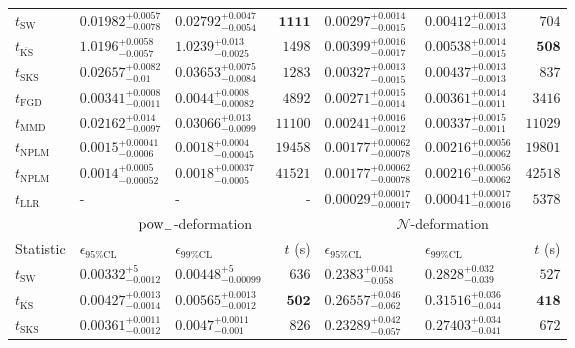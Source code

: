 \begin{tabular}{l|llr|llr}
	\midrule
	$t_{\mathrm{SW}}$ & $0.01982_{-0.0078}^{+0.0057}$ & $0.02792_{-0.0054}^{+0.0047}$ & ${\mathbf{1111}}$ & $0.00297_{-0.0015}^{+0.0014}$ & $0.00412_{-0.0013}^{+0.0013}$ & $704$ \\
	$t_{\overline{\mathrm{KS}}}$ & $1.0196_{-0.0057}^{+0.0058}$ & $1.0239_{-0.0025}^{+0.013}$ & $1498$ & $0.00399_{-0.0017}^{+0.0016}$ & $0.00538_{-0.0015}^{+0.0014}$ & ${\mathbf{508}}$ \\
	$t_{\mathrm{SKS}}$ & $0.02657_{-0.01}^{+0.0082}$ & $0.03653_{-0.0084}^{+0.0075}$ & $1283$ & $0.00327_{-0.0015}^{+0.0013}$ & $0.00437_{-0.0013}^{+0.0013}$ & $837$ \\
	$t_{\mathrm{FGD}}$ & ${\mathbf{0.00341_{-0.0011}^{+0.0008}}}$ & ${\mathbf{0.0044_{-0.00082}^{+0.0008}}}$ & $4892$ & $0.00271_{-0.0014}^{+0.0015}$ & $0.00361_{-0.0011}^{+0.0014}$ & $3416$ \\
	$t_{\mathrm{MMD}}$ & $0.02162_{-0.0097}^{+0.014}$ & $0.03066_{-0.0099}^{+0.013}$ & $11100$ & ${\mathbf{0.00241_{-0.0012}^{+0.0016}}}$ & ${\mathbf{0.00337_{-0.0011}^{+0.0015}}}$ & $11029$ \\
\rowcolor{red!35}	$t_{\mathrm{NPLM}}$ & $0.0015_{-0.0006}^{+0.00041}$ & $0.0018_{-0.00045}^{+0.0004}$ & $19458$ & $0.00177_{-0.00078}^{+0.00062}$ & $0.00216_{-0.00062}^{+0.00056}$ & $19801$ \\
\rowcolor{blue!35}	$t_{\mathrm{NPLM}}$ & $0.0014_{-0.00052}^{+0.0005}$ & $0.0018_{-0.0005}^{+0.00037}$ & $41521$ & $0.00177_{-0.00078}^{+0.00062}$ & $0.00216_{-0.00062}^{+0.00056}$ & $42518$ \\
	$t_{\mathrm{LLR}}$ & - & - & - & $0.00029_{-0.00017}^{+0.00017}$ & $0.00041_{-0.00016}^{+0.00017}$ & $5378$ \\
	\toprule
	\multicolumn{1}{c}{} & \multicolumn{3}{c}{$\rm{pow}_{-}$-deformation} & \multicolumn{3}{c}{$\mathcal{N}$-deformation} \\
	Statistic & $\epsilon_{95\%\mathrm{CL}}$ & $\epsilon_{99\%\mathrm{CL}}$ & $t$ (s) & $\epsilon_{95\%\mathrm{CL}}$ & $\epsilon_{99\%\mathrm{CL}}$ & $t$ (s) \\
	\midrule
	$t_{\mathrm{SW}}$ & $0.00332_{-0.0012}^{+5}$ & $0.00448_{-0.00099}^{+5}$ & $636$ & $0.2383_{-0.058}^{+0.041}$ & $0.2828_{-0.039}^{+0.032}$ & $527$ \\
	$t_{\overline{\mathrm{KS}}}$ & $0.00427_{-0.0014}^{+0.0013}$ & $0.00565_{-0.0012}^{+0.0013}$ & ${\mathbf{502}}$ & $0.26557_{-0.062}^{+0.046}$ & $0.31516_{-0.044}^{+0.036}$ & ${\mathbf{418}}$ \\
	$t_{\mathrm{SKS}}$ & $0.00361_{-0.0012}^{+0.0011}$ & $0.0047_{-0.001}^{+0.0011}$ & $826$ & $0.23289_{-0.057}^{+0.042}$ & $0.27403_{-0.041}^{+0.034}$ & $672$ \\

\end{tabular}
